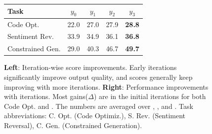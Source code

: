 \begin{figure}[ht]
\centering
\begin{minipage}{0.45\textwidth}
\centering

\fontsize{8pt}{10pt}\selectfont
\begin{tabular}{lcccc}
\toprule
\textbf{Task} & $y_0$ & \textbf{$y_1$} & \textbf{$y_2$} & \textbf{$y_3$}  \\
\midrule





Code Opt. & 22.0 & 27.0 & 27.9 & \textbf{28.8
}   \\
Sentiment Rev. & 33.9 & 34.9 & 36.1 & \textbf{36.8}  \\
Constrained Gen. & 29.0 & 40.3 & 46.7 & \textbf{49.7} \\ 
\bottomrule
\end{tabular}


\end{minipage}
\begin{minipage}{0.53\textwidth}
\centering
{}
\end{minipage}

\caption{\textbf{Left}: Iteration-wise score improvements. Early iterations significantly improve output quality, and scores generally keep improving with more iterations. \textbf{Right}: \ours Performance improvements with iterations. Most gains($\Delta$) are in the initial iterations for both Code Opt. and \sentxfer.
The numbers are averaged over \chatgpt, \gptt, and \gptf. Task abbreviations: C. Opt. (Code Optimiz.), S. Rev. (Sentiment Reversal), C. Gen. (Constrained Generation).}
\label{fig:iter_score_improvements}
\end{figure}

